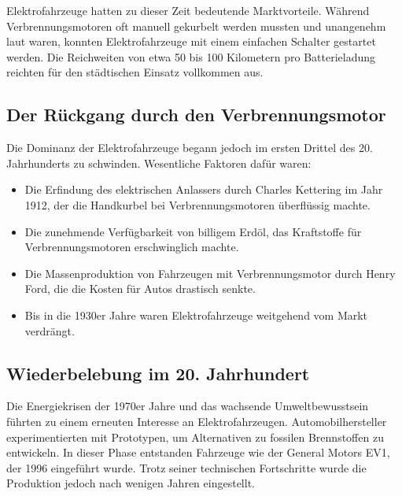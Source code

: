 Elektrofahrzeuge hatten zu dieser Zeit bedeutende Marktvorteile. Während Verbrennungsmotoren oft manuell gekurbelt werden mussten und unangenehm laut waren, konnten Elektrofahrzeuge mit einem einfachen Schalter gestartet werden. \autocite{enbw_elektroautos_vorteile_nachteile} Die Reichweiten von etwa 50 bis 100 Kilometern pro Batterieladung reichten für den städtischen Einsatz vollkommen aus. \autocite{adac_stromverbrauch_elektroautos}

\subsection*{Der Rückgang durch den Verbrennungsmotor}

Die Dominanz der Elektrofahrzeuge begann jedoch im ersten Drittel des 20. Jahrhunderts zu schwinden. Wesentliche Faktoren dafür waren:
\begin{itemize}
	\item Die Erfindung des elektrischen Anlassers durch Charles Kettering im Jahr 1912, der die Handkurbel bei Verbrennungsmotoren überflüssig machte. \autocite{greelane_charles_kettering}
	\item Die zunehmende Verfügbarkeit von billigem Erdöl, das Kraftstoffe für Verbrennungsmotoren erschwinglich machte. \autocite{tanke_guenstig_oelpreise}
	\item Die Massenproduktion von Fahrzeugen mit Verbrennungsmotor durch Henry Ford, die die Kosten für Autos drastisch senkte. \autocite{ardalpha_henry_ford_geschichte}
	\item Bis in die 1930er Jahre waren Elektrofahrzeuge weitgehend vom Markt verdrängt. \autocite{ardalpha_henry_ford_geschichte}
\end{itemize}

\subsection*{Wiederbelebung im 20. Jahrhundert}

Die Energiekrisen der 1970er Jahre und das wachsende Umweltbewusstsein führten zu einem erneuten Interesse an Elektrofahrzeugen. \autocite{daswissen_oelkrise_1970er} Automobilhersteller experimentierten mit Prototypen, um Alternativen zu fossilen Brennstoffen zu entwickeln. \autocite{energieleben_ev1_geschichte} In dieser Phase entstanden Fahrzeuge wie der General Motors EV1, der 1996 eingeführt wurde. \autocite{insideevs_gm_ev1}
Trotz seiner technischen Fortschritte wurde die Produktion jedoch nach wenigen Jahren eingestellt.\autocite{energieleben_ev1_geschichte} 

